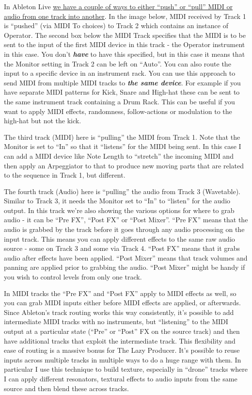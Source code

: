 \documentclass[
  12pt,
  letterpaper,
  oneside,
  open=any]{scrbook}
\begin{document}
In Ableton Live
\href{https://www.ableton.com/en/live-manual/11/routing-and-i-o/\#routing-and-io}{we
have a couple of ways to either ``push'' or ``pull'' MIDI or audio from
one track into another}. In the image below, MIDI received by Track 1 is
``pushed'' (via MIDI To choices) to Track 2 which contains an instance
of Operator. The second box below the MIDI Track specifies that the MIDI
is to be sent to the input of the first MIDI device in this track - the
Operator instrument in this case. You don't \textbf{\emph{have}} to have
this specified, but in this case it means that the Monitor setting in
Track 2 can be left on ``Auto''. You can also route the input to a
specific device in an instrument rack. You can use this approach to send
MIDI from multiple MIDI tracks to \textbf{\emph{the same device}}. For
example if you have separate MIDI patterns for Kick, Snare and High-hat
these can be sent to the same instrument track containing a Drum Rack.
This can be useful if you want to apply MIDI effects, randomness,
follow-actions or modulation to the high-hat but not the kick.

The third track (MIDI) here is ``pulling'' the MIDI from Track 1. Note
that the Monitor is set to ``In'' so that it ``listens'' for the MIDI
being sent. In this case I can add a MIDI device like Note Length to
``stretch'' the incoming MIDI and then apply an Arpeggiator to that to
produce new moving parts that are related to the sequence in Track 1,
but different.

The fourth track (Audio) here is ``pulling'' the audio from Track 3
(Wavetable). Similar to Track 3, it needs the Monitor set to ``In'' to
``listen'' for the audio output. In this track we're also showing the
various options for where to grab audio - it can be ``Pre FX'', ``Post
FX'' or ``Post Mixer''. ``Pre FX'' means that the audio is grabbed by
the track before it goes through any audio processing on the input
track. This means you can apply different effects to the same raw audio
source - some on Track 3 and some via Track 4. ``Post FX'' means that it
grabs audio after effects have been applied. ``Post Mixer'' means that
track volumes and panning are applied prior to grabbing the audio.
``Post Mixer'' might be handy if you wish to control levels from only
one track.

In MIDI tracks the ``Pre FX'' and ``Post FX'' apply to MIDI effects as
well, so you can grab MIDI inputs either before MIDI effects are
applied, or afterwards. Since Ableton's track routing works this way
consistently, it's possible to add intermediate MIDI tracks with no
instruments, but ``listening'' to the MIDI output at a particular state
(``Pre'' or ``Post'' FX on the source track) and then have additional
tracks that exploit the intermediate track. This flexibility and ease of
routing is a massive bonus for The Lazy Producer. It's possible to reuse
inputs across multiple tracks in multiple ways to do a huge range with
them. In particular I use this technique to build texture, especially in
``drone'' tracks where I can apply different resonators, textural
effects to audio inputs from the same source and then blend these across
tracks.
\end{document}
